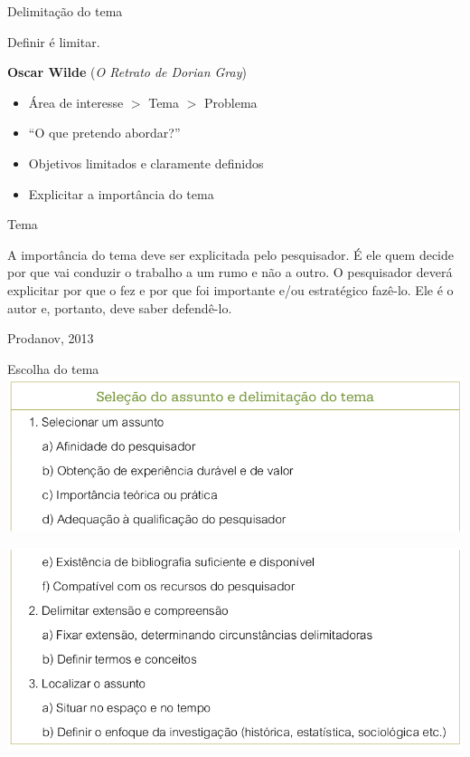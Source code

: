 \documentclass{beamer}
\begin{document}
\begin{frame}{Delimitação do tema}
  \begin{block}{}
    Definir é limitar.

    \bigskip
    {\bf Oscar Wilde} ({\em O Retrato de Dorian Gray})
  \end{block}
  \begin{itemize}
  \item Área de interesse $>$ Tema $>$ Problema
  \item ``O que pretendo abordar?''
  \item Objetivos limitados e claramente definidos
  \item Explicitar a importância do tema
  \end{itemize}
\end{frame}

\begin{frame}{Tema}
  \begin{block}{}
    A importância do tema deve ser explicitada pelo pesquisador. É ele
    quem decide por que vai conduzir o trabalho a um rumo e não a
    outro. O pesquisador deverá explicitar por que o fez e por que foi
    importante e/ou estratégico fazê-lo. Ele é o autor e, portanto,
    deve saber defendê-lo.
  \end{block}
  Prodanov, 2013
\end{frame}

\begin{frame}{Escolha do tema}
  \includegraphics[width=\textwidth]{Etapas/delimitacao1}

  \includegraphics[width=\textwidth]{Etapas/delimitacao2}
\end{frame}
\end{document}
